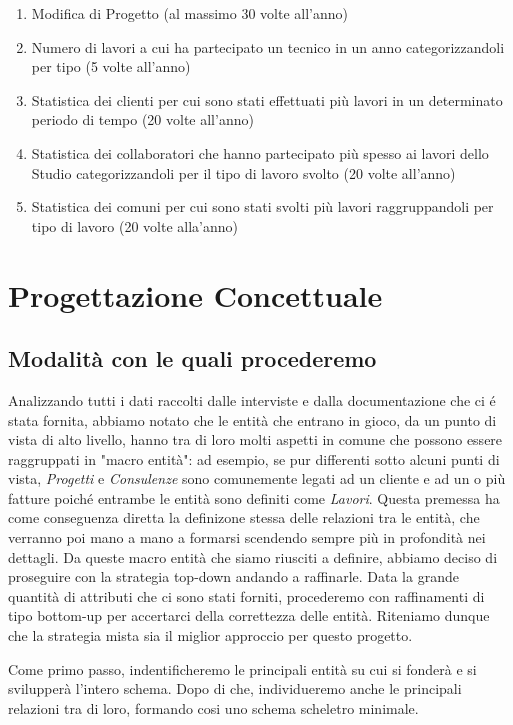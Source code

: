 \documentclass{elegantbook}
\begin{document}
\begin{enumerate}
                \item Modifica di Progetto (al massimo 30 volte all'anno)
                \item Numero di lavori a cui ha partecipato un tecnico in un anno categorizzandoli per tipo (5 volte all'anno)
                \item Statistica dei clienti per cui sono stati effettuati più lavori in un determinato periodo di tempo (20 volte all'anno)
                \item Statistica dei collaboratori che hanno partecipato più spesso ai lavori dello Studio categorizzandoli per il tipo di lavoro svolto (20 volte all'anno)
                \item Statistica dei comuni per cui sono stati svolti più lavori raggruppandoli per tipo di lavoro (20 volte alla'anno)
	\end{enumerate} 

	\chapter{Progettazione Concettuale}
	\section{Modalità con le quali procederemo}
        Analizzando tutti i dati raccolti dalle interviste e dalla documentazione che ci é stata fornita, abbiamo notato che le
        entità che entrano in gioco, da un punto di vista di alto livello, hanno tra di loro molti aspetti in comune che possono
        essere raggruppati in "macro entità": ad esempio, se pur differenti sotto alcuni punti di vista, \textit{Progetti} e
        \textit{Consulenze} sono comunemente legati ad un cliente e ad un o più fatture poiché entrambe le entità sono definiti 
        come \textit{Lavori}. Questa premessa ha come conseguenza diretta la definizone stessa delle relazioni tra le entità, che 
        verranno poi mano a mano a formarsi scendendo sempre più in profondità nei dettagli.
        Da queste macro entità che siamo riusciti a definire, abbiamo deciso di proseguire con la strategia top-down andando a raffinarle.
        Data la grande quantità di attributi che ci sono stati forniti, procederemo con raffinamenti di tipo bottom-up per accertarci della
        correttezza delle entità.
        Riteniamo dunque che la strategia mista sia il miglior approccio per questo progetto.
        
        Come primo passo, indentificheremo le principali entità su cui si fonderà e si svilupperà l'intero schema. Dopo di che, individueremo anche
        le principali relazioni tra di loro, formando cosi uno schema scheletro minimale.
\end{document}

